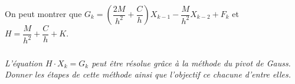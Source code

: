 \documentclass[10pt]{article}
\newif\ifprof
\begin{document}
\begin{rem}
On peut montrer que $G_k = \left(\dfrac{2M}{h^2}+\dfrac{C}{h} \right)X_{k-1} - \dfrac{M}{h^2} X_{k-2} + F_k $ et $H = \dfrac{M}{h^2} + \dfrac{C}{h} + K$.
\end{rem}

\subparagraph{}
\textit{L'équation  $H\cdot X_k = G_k$ peut être résolue grâce à la méthode du pivot de Gauss. Donner les étapes de cette méthode ainsi que l'objectif ce chacune d'entre elles. }
\ifprof
\begin{corrige}
\end{corrige}
\else
\fi
\end{document}
